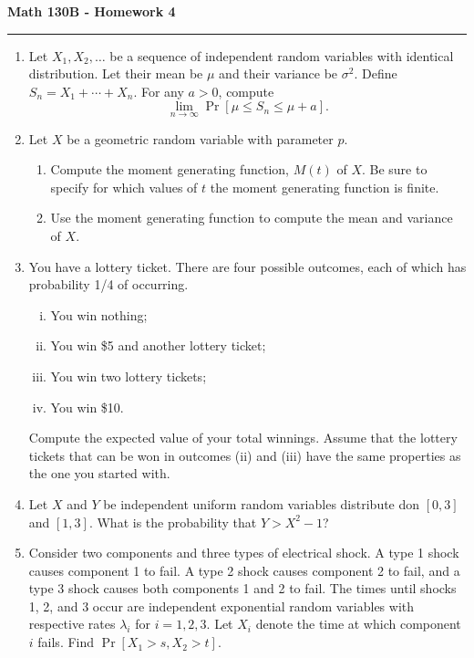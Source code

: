 \documentclass[11pt,letterpaper]{article}
\begin{document}
\begin{center}
{\bf \Large Math 130B - Homework 4}
\vspace{0.2cm}
\hrule
\end{center}



\begin{enumerate}

    \item Let $X_1, X_2, \ldots$ be a sequence of independent random variables with identical distribution. Let their mean be $\mu$ and their variance be $\sigma^2$.
    Define $S_n = X_1 + \cdots + X_n$.
    For any $a > 0$, compute
    \[
        \lim_{n\to \infty}\Pr[\mu \leq S_n \leq \mu + a].
    \]

    \item Let $X$ be a geometric random variable with parameter $p$.
    \begin{enumerate}
        \item Compute the moment generating function, $M(t)$ of $X$.
        Be sure to specify for which values of $t$ the moment generating function is finite.

        \item Use the moment generating function to compute the mean and variance of $X$.
    \end{enumerate}

    \item You have a lottery ticket. There are four possible outcomes, each of which has probability 1/4 of occurring.
    \begin{enumerate}[(i)]
        \item You win nothing;
        \item You win \$5 and another lottery ticket;
        \item You win two lottery tickets;
        \item You win \$10.
    \end{enumerate}
    Compute the expected value of your total winnings. Assume that the lottery tickets that can be won in outcomes (ii) and (iii) have the same properties as the one you started with.

    \item Let $X$ and $Y$ be independent uniform random variables distribute don $[0,3]$ and $[1,3]$. What is the probability that $Y > X^2-1$?

    \item Consider two components and three types of electrical shock.
    A type 1 shock causes component 1 to fail.
    A type 2 shock causes component 2 to fail, and a type 3 shock causes both components 1 and 2 to fail.
    The times until shocks 1, 2, and 3 occur are independent exponential random variables with respective rates $\lambda_i$ for $i = 1,2,3$.
    Let $X_i$ denote the time at which component $i$ fails.
    Find $\Pr[X_1 > s, X_2 > t]$.


\end{enumerate}
\end{document}

